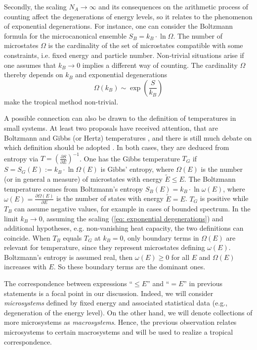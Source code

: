 \documentclass[11pt,british,reqno]{article}
\numberwithin{equation}{section}
\numberwithin{figure}{section}
\numberwithin{table}{section}
\theoremstyle{definition}
\theoremstyle{definition}
\theoremstyle{plain}
\theoremstyle{plain}
\theoremstyle{remark}
\theoremstyle{plain}
\numberwithin{equation}{section}
\numberwithin{figure}{section}
\numberwithin{table}{section}
\theoremstyle{plain}
\begin{document}
Secondly, the scaling $N_A\rightarrow \infty$ and its consequences on the
arithmetic process of counting affect the degenerations of energy levels, so it relates to the phenomenon of exponential degenerations. For instance, one can consider the Boltzmann
formula for the microcanonical ensemble $S_{B}=k_{B}\cdot\ln\Omega$. The number of microstates
$\Omega$ is the cardinality of the set of microstates compatible
with some constraints, i.e. fixed energy and particle number. Non-trivial
situations arise if one assumes that $k_{B}\rightarrow0$ implies
a different way of counting. The cardinality $\Omega$ thereby depends
on $k_{B}$ and exponential degenerations 
\begin{equation}
\Omega(k_{B})\sim\exp\left(\frac{S}{k_{B}}\right)\label{eq: exponential degenerations}
\end{equation}
make the tropical method non-trivial. 

A possible connection can also be drawn to the definition of temperatures
in small systems. At least two proposals have received attention,
that are Boltzmann and Gibbs (or Hertz) temperatures \cite{Frenkel2015},
and there is still much debate on which definition should be adopted
\cite{DunkelHilbert2014,Frenkel2015}. In both cases,
they are deduced from entropy via ${\displaystyle T=\left(\frac{\partial S}{\partial E}\right)^{-1}}$.
One has the Gibbs temperature $T_{G}$ if $S=S_{G}(E):=k_{B}\cdot\ln\Omega(E)$
is Gibbs' entropy, where $\Omega(E)$ is the number (or in general
a measure) of microstates with energy $\tilde{E}\leq E$. The Boltzmann
temperature comes from Boltzmann's entropy ${\displaystyle S_{B}(E)=k_{B}\cdot\ln\omega(E)}$,
where ${\displaystyle \omega(E)=\frac{\partial\Omega(E)}{\partial E}}$
is the number of states with energy $\tilde{E}=E$. $T_{G}$ is positive
while $T_{B}$ can assume negative values, for example in cases of
bounded spectrum. In the limit $k_{B}\rightarrow0$, assuming the
scaling (\ref{eq: exponential degenerations}) and additional hypotheses,
e.g. non-vanishing heat capacity, the two definitions
can coincide. 
When $T_{B}$ equals $T_{G}$ at $k_{B}=0$, only boundary terms in
$\Omega(E)$ are relevant for temperature, since they represent microstates
defining $\omega(E)$. Boltzmann's entropy is assumed real, then $\omega(E)\geq0$
for all $E$ and $\Omega(E)$ increases with $E$. So these boundary
terms are the dominant ones. 

The correspondence between expressions ``$\leq E$'' and ``$=E$''
in previous statements is a focal point in our discussion. Indeed,
we will consider \emph{microsystems} defined by fixed energy and associated
statistical data (e.g., degeneration of the energy level). On the
other hand, we will denote collections of more microsystems as \emph{macrosystems}.
Hence, the previous observation relates microsystems to certain macrosystems
and will be used to realize a tropical correspondence. 
\end{document}
